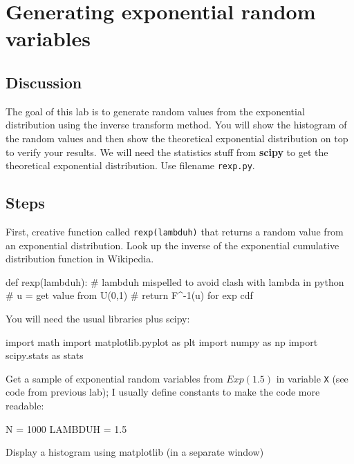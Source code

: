 \chapter{Generating exponential random variables}

\setcounter{problem}{1}
\section{Discussion}

\begin{fullwidth}

The goal of this lab is to generate random values from the exponential distribution using the inverse transform method.  You will show the histogram of the random values and then show the theoretical exponential distribution on top to verify your results. We will need the statistics stuff from {\bf scipy} to get the theoretical exponential distribution. Use filename {\tt rexp.py}.

\section{Steps}

\step First, creative function called {\tt rexp(lambduh)} that returns a random value from an exponential distribution. Look up the inverse of the exponential cumulative distribution function in Wikipedia.

\begin{pyverbatim}
def rexp(lambduh): # lambduh mispelled to avoid clash with lambda in python
    # u = get value from U(0,1)
    # return F^-1(u) for exp cdf
\end{pyverbatim}

\step You will need the usual libraries plus scipy:

\begin{pyverbatim}
import math
import matplotlib.pyplot as plt
import numpy as np
import scipy.stats as stats
\end{pyverbatim}

\step Get a sample of exponential random variables from $Exp(1.5)$ in variable {\tt X} (see code from previous lab); I usually define constants to make the code more readable:

\begin{pyverbatim}
N = 1000
LAMBDUH = 1.5
\end{pyverbatim}

\step Display a histogram using matplotlib (in a separate window)


\end{fullwidth}
